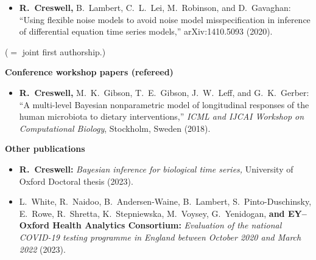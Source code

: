 \documentclass[10pt]{article}
\begin{document}
\begin{itemize}[leftmargin=*]
\item \textbf{R.\ Creswell,} {\color{gray} B.\ Lambert, C.\ L.\ Lei, M.\ Robinson, and D.\ Gavaghan:} ``Using flexible noise models to avoid noise model misspecification in inference of differential equation time series models,'' arXiv:1410.5093 (2020).
\end{itemize}
\hfill(\textsuperscript{\dag}$=$ joint first authorship.)




\vspace*{.4cm}
\noindent\textbf{Conference workshop papers (refereed)}
\vspace*{.5cm}
\begin{itemize}[leftmargin=*]
\setlength{\itemsep}{4pt}
\setlength{\parskip}{0pt}
\setlength{\parsep}{0pt}
\vspace{-.5cm}
\item \textbf{R.\ Creswell,} {\color{gray} M.\ K.\ Gibson, T.\ E.\ Gibson, J.\ W.\ Leff, and G.\ K.\ Gerber:} ``A multi-level Bayesian nonparametric model of longitudinal responses of the human microbiota to dietary interventions,'' \emph{ICML and IJCAI
Workshop on Computational Biology}, Stockholm, Sweden (2018).
\end{itemize}





\vspace*{.4cm}
\noindent\textbf{Other publications}
\vspace*{.5cm}
\begin{itemize}[leftmargin=*]
\setlength{\itemsep}{4pt}
\setlength{\parskip}{0pt}
\setlength{\parsep}{0pt}
\vspace{-.5cm}
\item \textbf{R.\ Creswell:} \emph{Bayesian inference for biological time series,} University of Oxford Doctoral thesis (2023).
\item {\color{gray}L.\ White, R.\ Naidoo, B.\ Andersen-Waine, B.\ Lambert, S.\ Pinto-Duschinsky, E.\ Rowe, R.\ Shretta, K.\ Stepniewska, M.\ Voysey, G.\ Yenidogan,} \textbf{and EY--Oxford Health Analytics Consortium:} \emph{Evaluation of the national COVID-19 testing programme in England between October 2020 and March 2022} (2023).


\end{itemize}



\vspace*{.4cm}
\end{document}
